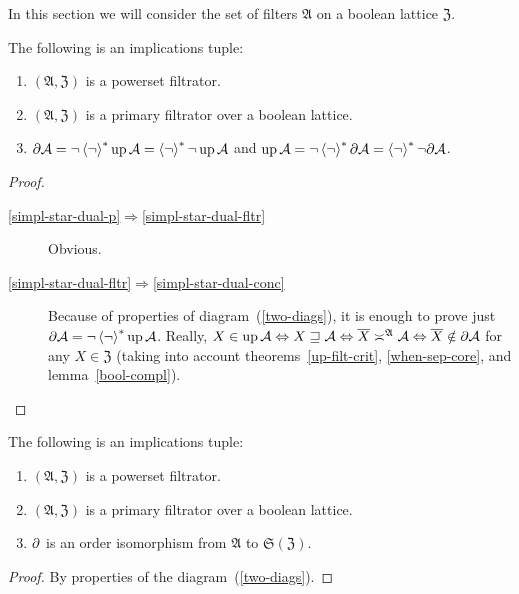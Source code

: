 In this section we will consider the set of filters $\mathfrak{A}$
on a boolean lattice $\mathfrak{Z}$.
\begin{thm}
\label{f-simpl-star-dual}The following is an implications tuple:
\begin{enumerate}
\item \label{simpl-star-dual-p}$(\mathfrak{A},\mathfrak{Z})$ is a powerset
filtrator.
\item \label{simpl-star-dual-fltr}$(\mathfrak{A},\mathfrak{Z})$ is a primary
filtrator over a boolean lattice.
\item \label{simpl-star-dual-conc}$\partial\mathcal{A}=\lnot\left\langle \lnot\right\rangle ^{\ast}\operatorname{up}\mathcal{A}=\left\langle \lnot\right\rangle ^{\ast}\lnot\operatorname{up}\mathcal{A}$
and $\operatorname{up}\mathcal{A}=\lnot\left\langle \lnot\right\rangle ^{\ast}\partial\mathcal{A}=\left\langle \lnot\right\rangle ^{\ast}\lnot\partial\mathcal{A}$.
\end{enumerate}
\end{thm}
\begin{proof}
~
\begin{description}
\item [{\ref{simpl-star-dual-p}$\Rightarrow$\ref{simpl-star-dual-fltr}}] Obvious.
\item [{\ref{simpl-star-dual-fltr}$\Rightarrow$\ref{simpl-star-dual-conc}}] Because
of properties of diagram~(\ref{two-diags}), it is enough to prove
just $\partial\mathcal{A}=\lnot\left\langle \lnot\right\rangle ^{\ast}\operatorname{up}\mathcal{A}$. Really,
$X\in\operatorname{up}\mathcal{A}\Leftrightarrow X\sqsupseteq\mathcal{A}\Leftrightarrow\overline{X}\asymp^{\mathfrak{A}}\mathcal{A}\Leftrightarrow\overline{X}\notin\partial\mathcal{A}$
for any $X\in\mathfrak{Z}$ (taking into account theorems~\ref{up-filt-crit},
\ref{when-sep-core}, and lemma~\ref{bool-compl}).
\end{description}
\end{proof}
\begin{cor}
\label{d-inj}The following is an implications tuple:
\begin{enumerate}
\item $(\mathfrak{A},\mathfrak{Z})$ is a powerset filtrator.
\item $(\mathfrak{A},\mathfrak{Z})$ is a primary filtrator over a boolean
lattice.
\item $\partial$ is an order isomorphism from $\mathfrak{A}$ to $\mathfrak{S}(\mathfrak{Z})$.
\end{enumerate}
\end{cor}
\begin{proof}
By properties of the diagram~(\ref{two-diags}).\end{proof}

